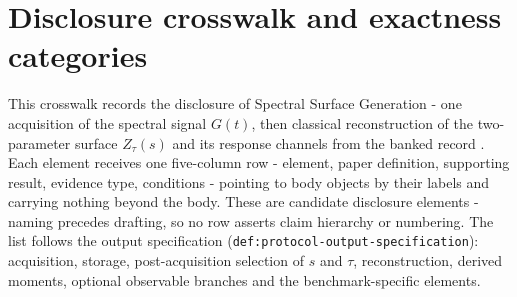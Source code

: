 \section{Disclosure crosswalk and exactness categories}
\label{app:NA3}

This crosswalk records the disclosure of Spectral Surface Generation - one acquisition of the spectral signal $G(t)$, then classical reconstruction of the two-parameter surface $Z_\tau(s)$ and its response channels from the banked record \cite{mccaul2025snacks,leamer2024emulation}. Each element receives one five-column row - element, paper definition, supporting result, evidence type, conditions - pointing to body objects by their labels and carrying nothing beyond the body. These are candidate disclosure elements - naming precedes drafting, so no row asserts claim hierarchy or numbering. The list follows the output specification (\texttt{def:protocol-output-specification}): acquisition, storage, post-acquisition selection of $s$ and $\tau$, reconstruction, derived moments, optional observable branches and the benchmark-specific elements.


